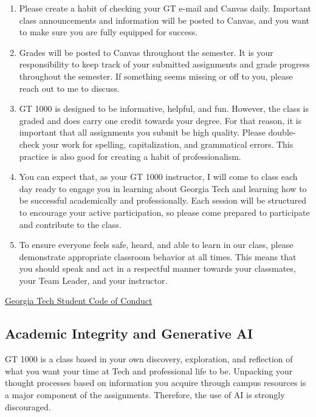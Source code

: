 \documentclass[11pt]{article}
\begin{document}
\begin{enumerate}
    \item Please create a habit of checking your GT e-mail and Canvas
    daily. Important class announcements and information will be posted
    to Canvas, and you want to make sure you are fully equipped for
    success.

    \item Grades will be posted to Canvas throughout the semester. It
    is your responsibility to keep track of your submitted assignments
    and grade progress throughout the semester. If something seems
    missing or off to you, please reach out to me to discuss.

    \item GT 1000 is designed to be informative, helpful, and fun.
    However, the class is graded and does carry one credit towards your
    degree. For that reason, it is important that all assignments you
    submit be high quality. Please double-check your work for spelling,
    capitalization, and grammatical errors. This practice is also good
    for creating a habit of professionalism.

    \item You can expect that, as your GT 1000 instructor, I will come
    to class each day ready to engage you in learning about Georgia Tech
    and learning how to be successful academically and professionally.
    Each session will be structured to encourage your active
    participation, so please come prepared to participate and contribute
    to the class.

    \item To ensure everyone feels safe, heard, and able to learn in
    our class, please demonstrate appropriate classroom behavior at all
    times. This means that you should speak and act in a respectful
    manner towards your classmates, your Team Leader, and your
    instructor.
\end{enumerate}

\href{https://policylibrary.gatech.edu/student-life/student-code-conduct}
{Georgia Tech Student Code of Conduct}

\subsection*{Academic Integrity and Generative AI}

GT 1000 is a class based in your own discovery, exploration, and
reflection of what you want your time at Tech and professional life to
be. Unpacking your thought processes based on information you acquire
through campus resources is a major component of the assignments.
Therefore, the use of AI is strongly discouraged.
\end{document}
